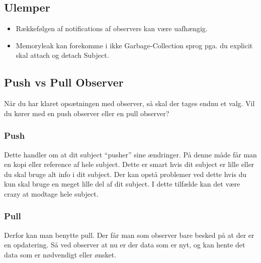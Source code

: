 \documentclass[../SWD_disp.tex]{subfiles}
\begin{document}
\subsection*{Ulemper}
\begin{itemize}
    \item Rækkefølgen af notifications af observers kan være uafhængig.
    \item Memoryleak kan forekomme i ikke Garbage-Collection sprog pga. du explicit skal attach og detach Subject.
\end{itemize}
\subsection{Push vs Pull Observer}
Når du har klaret opsætningen med observer, så skal der tages endnu et valg. Vil du kører med en push observer eller en pull observer?
\subsubsection{Push}
Dette handler om at dit subject ``pusher'' sine ændringer. På denne måde får man en kopi eller reference af hele subject. Dette er smart hvis dit subject er lille eller du skal bruge alt info i dit subject. Der kan opstå problemer ved dette hvis du kun skal bruge en meget lille del af dit subject. I dette tilfælde kan det være crazy at modtage hele subject.    
\subsubsection{Pull}
Derfor kan man benytte pull. Der får man som observer bare besked på at der er en opdatering. Så ved observer at nu er der data som er nyt, og kan hente det data som er nødvendigt eller ønsket. 





\end{document}
